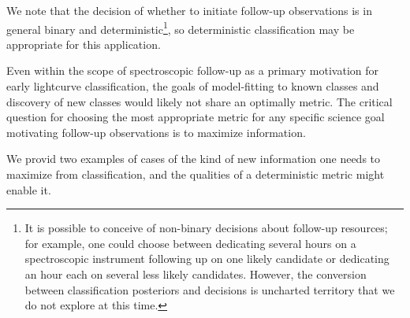 
We note that the decision of whether to initiate follow-up observations is in general binary and deterministic\footnote{It is possible to conceive of non-binary decisions about follow-up resources; for example, one could choose between dedicating several hours on a spectroscopic instrument following up on one likely candidate or dedicating an hour each on several less likely candidates.  However, the conversion between classification posteriors and decisions is uncharted territory that we do not explore at this time.}, so deterministic classification may be appropriate for this application.

Even within the scope of spectroscopic follow-up as a primary motivation for early lightcurve classification, the goals of model-fitting to known classes and discovery of new classes would likely not share an optimally metric. The critical question for choosing the most appropriate metric for any specific science goal motivating follow-up observations is to maximize information.

We provid two examples of cases of the kind of new information one needs to maximize from classification, and the qualities of a deterministic metric might enable it.

